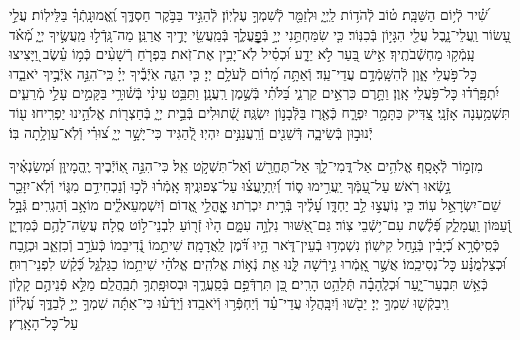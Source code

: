 \documentclass[twoside, openany, parskip=half, 11pt]{book}
\begin{document}


שִׁ֝֗יר לְֿי֥וֹם הַשַּׁבָּֽת׃
ט֗וֹב לְֿהֹד֥וֹת לַֽיְיָ֑ וּלְזַמֵּ֖ר לְֿשִׁמְךָ֣ עֶלְיֽוֹן׃
לְֿהַגִּ֣יד בַּבֹּ֣קֶר חַסְדֶּ֑ךָ וֶֽ֝אֱמוּנָֽתְֿךָ֗ בַּלֵּילֽוֹת׃
עֲלֵ֣י עָ֭שׂוֹר וַֽעֲלֵי־נָ֑בֶל עֲלֵ֖י הִגָּי֣וֹן בְּֿכִנּֽוֹר׃
כִּ֤י שִׂמַּחְתַּ֣נִי יְיָ֣ בְּֿפׇׇׇׇׇׇׇָֽעֳלֶ֑ךָ בְּֿמַֽעֲשֵׂ֖י יָדֶ֣יךָ אֲרַנֵּֽן׃
מַה־גָּֽדְֿל֣וּ מַֽעֲשֶׂ֣יךָ יְיָ֑ מְֿ֝אֹ֗ד עָֽמְֿק֥וּ מַחְשְֿׁבֹתֶֽיךָ׃
אִ֣ישׁ בַּ֭עַר לֹ֣א יֵדָ֑ע וּ֝כְסִ֗יל לֹֽא־יָבִ֥ין אֶת־זֹֽאת׃
בִּפְרֹ֤חַ רְֿשָׁעִ֨ים כְּֿמ֥וֹ עֵ֗שֶׂב וַ֭יָּצִיצוּ כׇּל־פֹּ֣עֲלֵי אָ֑וֶן לְֿהִשָּֽׁמְֿדָ֥ם עֲדֵי־עַֽד׃
וְֿאַתָּ֥ה מָ֝ר֗וֹם לְֿעֹלָ֥ם יְיָ׃
כִּ֤י הִנֵּ֢ה אֹֽיְֿבֶ֡יךָ יְיָ֗ כִּֽי־ֹהִנֵּ֣ה אֹֽיְֿבֶ֣יךָ יֹאבֵ֑דוּ יִ֝תְפָּֽרְֿד֗וּ כׇּל־פֹּ֥עֲלֵי אָֽוֶן׃
וַתָּ֣רֶם כִּרְאֵ֣ים קַרְנִ֑י בַּ֝לֹּתִ֗י בְּֿשֶׁ֣מֶן רַֽעֲנָֽן׃
וַתַּבֵּ֥ט עֵינִ֗י בְּֿשׁ֫וּרָ֥י בַּקָּמִ֣ים עָלַ֣י מְֿרֵעִ֑ים תִּשְׁמַ֥עְנָה אָזְֿנָֽי׃
צַ֭דִּיק כַּתָּמָ֣ר יִפְרָ֑ח כְּֿאֶ֖רֶז בַּלְּֿבָנ֣וֹן יִשְׂגֶּֽה׃
שְֿׁ֭תוּלִים בְּֿבֵ֣ית יְיָ֑ בְּֿחַצְר֖וֹת אֱלֹהֵ֣ינוּ יַפְרִֽיחוּ׃
ע֖וֹד יְֿנוּב֣וּן בְּֿשֵׂיבָ֑ה דְּֿשֵׁנִ֖ים וְֿרַֽעֲנַנִּ֣ים יִהְיֽוּ׃
לְֿ֭הַגִּיד כִּי־יָשָׁ֣ר יְיָ֑ צ֝וּרִ֗י וְֿלֹֽא־עַוְלָ֥תָה בּֽוֹ׃


מִזְמ֣וֹר לְֿאָסָֽף׃ אֱלֹהִ֥ים אַל־דֳּמִי־לָ֑ךְ אַל־תֶּחֱרַ֖שׁ וְֿאַל־תִּשְׁקֹ֣ט אֵֽל׃ כִּי־הִנֵּ֣ה אֽ֭וֹיְֿבֶיךָ יֶֽהֱמָיוּ֑ן וּ֝מְשַׂנְאֶ֗יךָ נָ֣שְֿׂאוּ רֹֽאשׁ׃ עַל־עַ֭מְּֿךָ יַֽעֲרִ֣ימוּ ס֑וֹד וְֿ֝יִֽתְיָֽעֲצ֗וּ עַל־צְפוּנֶֽיךָ׃ אָֽמְֿר֗וּ לְֿכ֣וּ וְֿנַכְחִידֵ֣ם מִגּ֑וֹי וְֿלֹֽא־יִזָּכֵ֖ר שֵׁם־יִשְׂרָאֵ֣ל עֽוֹד׃ כִּ֤י נֽוֹעֲצ֣וּ לֵ֣ב יַחְדָּ֑ו עָ֝לֶ֗יךָ בְּֿרִ֣ית יִכְרֹֽתוּ׃ אׇׇׇׇׇׇָֽהֳלֵ֣י אֱ֭דוֹם וְֿיִשְׁמְעֵאלִ֑֗ים מוֹאָ֥ב וְֿהַגְרִֽים׃ גְּֿבָ֣ל וְֿ֭עַמּוֹן וַֽעֲמָלֵ֑ק פְּֿ֝לֶ֗שֶׁת עִם־י֥שְֿׁבֵי צֽוֹר׃ גַּם־אַ֭שּׁוּר נִלְוָ֣ה עִמָּ֑ם הָי֙וּ זְֿר֖וֹעַ לִבְנֵי־ל֣וֹט סֶֽלָה׃ עֲשֵׂה־לָהֶ֥ם כְּֿמִדְיָ֑ן כְּֿסִֽיסְֿרָ֥א כְֿ֝יָבִ֗ין בְּֿנַ֣חַל קִישֽׁוֹן׃ נִשְׁמְד֥וּ בְֿעֵין־דֹּ֑אר הָ֥יוּ דֹּ֝֗מֶן לַֽאֲדָמָֽה׃ שִׁיתֵ֣מוֹ נְֿ֭דִיבֵמוֹ כְּֿעֹרֵ֣ב וְֿכִזְאֵ֑ב וּכְזֶ֥בַח וּ֝כְצַלְמֻנָּ֗ע כׇּל־נְסִיכֵֽמוֹ׃ אֲשֶׁ֣ר אָֽ֭מְֿרוּ נִ֣ירְֿשָׁה לָּ֑נוּ אֵ֖ת נְֿא֣וֹת אֱלֹהִֽים׃ אֱלֹהַ֗י שִׁיתֵ֥מוֹ כַגַּלְגַּ֑ל כְּֿ֝קַ֗שׁ לִפְנֵי־רֽוּחַ׃ כְּֿאֵ֥שׁ תִּבְעַר־יָ֑עַר וּ֝כְלֶֽהָבָ֗ה תְּֿלַהֵ֥ט הָרִֽים׃ כֵּ֭ן תִּרְדְּֿפֵ֣ם בְּֿסַֽעֲרֶ֑ךָ וּבְסוּפָֽתְךָ֥ תְֿבַֽהֲלֵֽם׃ מַלֵּ֣א פְֿנֵיהֶ֣ם קָל֑וֹן וִֽיבַקְֿשׁ֖וּ שִׁמְךָ֣ יְיָ׃ יֵבֹ֖שׁוּ וְֿיִבָּֽהֲל֥וּ עֲדֵי־עַ֗ד וְֿיַחְפְּֿר֥וּ וְֿיֹאבֵֽדוּ׃ וְֿיֵֽדְֿע֗וּ כִּי־אַתָּ֬ה שִׁמְךָ֣ יְיָ֣ לְֿבַדֶּ֑ךָ עֶ֝לְי֗וֹן עַל־כׇּל־הָאָֽרֶץ׃

\mournerskaddish
\end{document}
